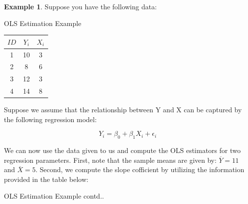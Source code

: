 \documentclass[
]{book}
\theoremstyle{definition}
\theoremstyle{definition}
\newtheorem{example}{Example}[chapter]
\theoremstyle{definition}
\theoremstyle{definition}
\theoremstyle{remark}
\begin{document}
\begin{example}
\protect\hypertarget{exm:unnamed-chunk-59}{}\label{exm:unnamed-chunk-59}Suppose you have the following data:

\label{tab:ch3table1} OLS Estimation Example

\begin{longtable}[]{@{}ccc@{}}
\toprule()
\(ID\) & \(Y_i\) & \(X_i\) \\
\midrule()
\endhead
1 & 10 & 3 \\
2 & 8 & 6 \\
3 & 12 & 3 \\
4 & 14 & 8 \\
\bottomrule()
\end{longtable}

Suppose we assume that the relationship between Y and X can be captured by the following regression model:

\[Y_i=\beta_0 + \beta_1 X_i + \epsilon_i\]

We can now use the data given to us and compute the OLS estimators for two regression parameters. First, note that the sample means are given by: \(\overline{Y}=11\) and \(\overline{X}=5\). Second, we compute the slope cofficient by utilizing the information provided in the table below:

\label{tab:ch3table2} OLS Estimation Example contd..


\end{example}
\end{document}
